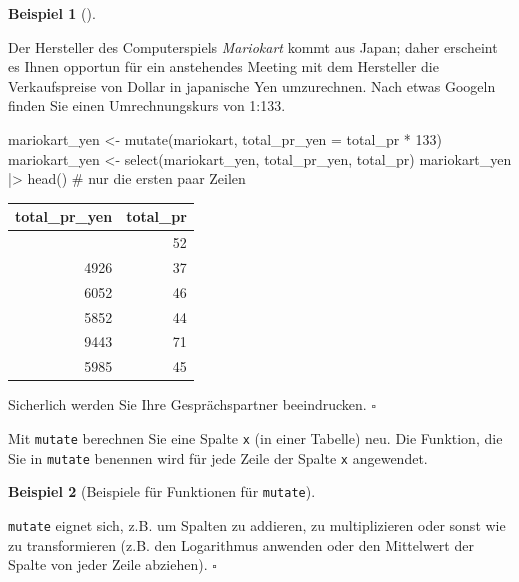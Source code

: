\documentclass[
  letterpaper,
  twoside,
  open=any]{scrbook}
\newenvironment{Shaded}{\begin{snugshade}}{\end{snugshade}}
\newcommand{\AttributeTok}[1]{\textcolor[rgb]{0.40,0.45,0.13}{#1}}
\newcommand{\CommentTok}[1]{\textcolor[rgb]{0.37,0.37,0.37}{#1}}
\newcommand{\DecValTok}[1]{\textcolor[rgb]{0.68,0.00,0.00}{#1}}
\newcommand{\FunctionTok}[1]{\textcolor[rgb]{0.28,0.35,0.67}{#1}}
\newcommand{\NormalTok}[1]{\textcolor[rgb]{0.00,0.23,0.31}{#1}}
\newcommand{\OtherTok}[1]{\textcolor[rgb]{0.00,0.23,0.31}{#1}}
\newcommand{\SpecialCharTok}[1]{\textcolor[rgb]{0.37,0.37,0.37}{#1}}
\theoremstyle{definition}
\theoremstyle{definition}
\theoremstyle{definition}
\newtheorem{example}{Beispiel}[chapter]
\theoremstyle{remark}
\begin{document}
\begin{example}[]\protect\hypertarget{exm-mutate}{}\label{exm-mutate}

Der Hersteller des Computerspiels \emph{Mariokart} kommt aus Japan;
daher erscheint es Ihnen opportun für ein anstehendes Meeting mit dem
Hersteller die Verkaufspreise von Dollar in japanische Yen umzurechnen.
Nach etwas Googeln finden Sie einen Umrechnungskurs von 1:133.

\begin{Shaded}
\begin{Highlighting}[]
\NormalTok{mariokart\_yen }\OtherTok{\textless{}{-}} 
  \FunctionTok{mutate}\NormalTok{(mariokart, }\AttributeTok{total\_pr\_yen =}\NormalTok{ total\_pr }\SpecialCharTok{*} \DecValTok{133}\NormalTok{)}
\NormalTok{mariokart\_yen }\OtherTok{\textless{}{-}} \FunctionTok{select}\NormalTok{(mariokart\_yen, total\_pr\_yen, total\_pr)}
\NormalTok{mariokart\_yen }\SpecialCharTok{|\textgreater{}} \FunctionTok{head}\NormalTok{()  }\CommentTok{\# nur die ersten paar Zeilen}
\end{Highlighting}
\end{Shaded}

\begin{longtable}[]{@{}rr@{}}
\toprule\noalign{}
total\_pr\_yen & total\_pr \\
\midrule\noalign{}
\endhead
\bottomrule\noalign{}
\endlastfoot
6856 & 52 \\
4926 & 37 \\
6052 & 46 \\
5852 & 44 \\
9443 & 71 \\
5985 & 45 \\
\end{longtable}

Sicherlich werden Sie Ihre Gesprächspartner beeindrucken. \(\square\)

\end{example}

Mit \texttt{mutate} berechnen Sie eine Spalte \texttt{x} (in einer
Tabelle) neu. Die Funktion, die Sie in \texttt{mutate} benennen wird für
jede Zeile der Spalte \texttt{x} angewendet.

\begin{example}[Beispiele für Funktionen für
\texttt{mutate}]\protect\hypertarget{exm-mutate2}{}\label{exm-mutate2}

\texttt{mutate} eignet sich, z.B. um Spalten zu addieren, zu
multiplizieren oder sonst wie zu transformieren (z.B. den Logarithmus
anwenden oder den Mittelwert der Spalte von jeder Zeile abziehen).
\(\square\)

\end{example}
\end{document}
